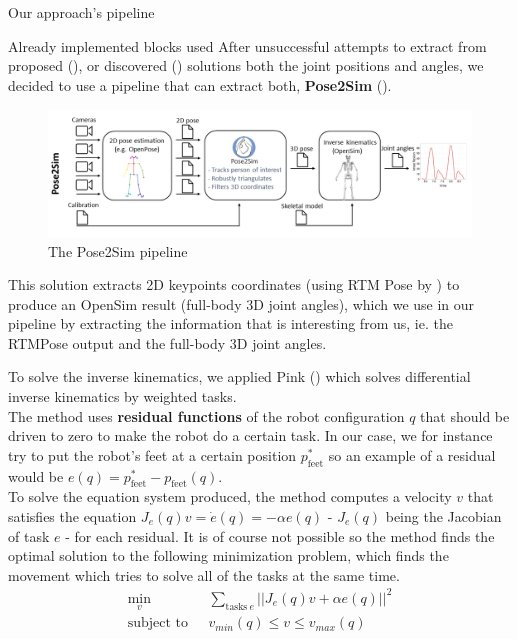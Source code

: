 \documentclass[final]{beamer}
\newlength{\colwidth}
\begin{document}
\begin{frame}[t]
\begin{columns}[t]
\begin{column}{\colwidth}
\begin{block}{Our approach's pipeline}
  \end{block}
  
\begin{block}{Already implemented blocks used}
After unsuccessful attempts to extract from proposed (\cite{Li_2019}), or discovered (\cite{li2023niki}) solutions both the joint positions and angles, we decided to use a pipeline that can extract both, \textbf{Pose2Sim} (\cite{Pose2Sim}). 
 \begin{figure}
      \centering
      \includegraphics[width = 0.99 \columnwidth]{img/pose2sim_pipeline.png}
      \caption{The Pose2Sim pipeline}
    \end{figure}
\end{block}
This solution extracts 2D keypoints coordinates (using RTM Pose by \cite{RTMPose}) to produce an OpenSim result (full-body 3D joint angles), which we use in our pipeline by extracting the information that is interesting from us, ie. the RTMPose output and the full-body 3D joint angles. 

To solve the inverse kinematics, we applied Pink (\cite{pink2024}) which solves differential inverse kinematics by weighted tasks. \\ 
The method uses \textbf{residual functions} of the robot configuration $q$ that should be driven to zero to make the robot do a certain task. In our case, we for instance try to put the robot's feet at a certain position $p_{\text{feet}}^*$ so an example of a residual would be $e(q) = p_{\text{feet}}^* - p_{\text{feet}}(q)$. \\
To solve the equation system produced, the method computes a velocity $v$ that satisfies the equation $J_e(q)v = \dot{e}(q) = -\alpha e(q)$ - $J_e(q)$ being the Jacobian of task $e$ - for each residual. 
It is of course not possible so the method finds the optimal solution to the following minimization problem, which finds the movement which tries to solve all of the tasks at the same time.
$$
\begin{aligned}
\min_v \ \ &\sum_{\text{tasks} \ e} ||J_e(q)v + \alpha e(q)||^2 \\
\text{subject to} \ \ \ &v_{min}(q) \leq v \leq v_{max}(q)
\end{aligned}
$$


\end{column}
\end{columns}
\end{frame}
\end{document}
